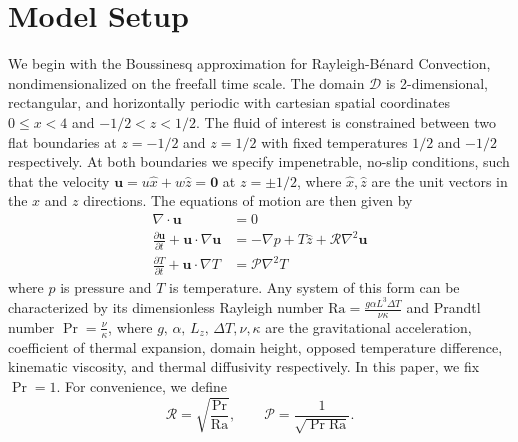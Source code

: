 \documentclass[reprint,amsmath,amssymb,aps,nofootinbib]{revtex4-1}
\newcommand\Ra{\mathrm{Ra}}
\renewcommand{\vec}[1]{\boldsymbol{#1}}
\begin{document}
\section{Model Setup}\label{sec:model}
We begin with the Boussinesq approximation for Rayleigh-Bénard Convection, nondimensionalized on the freefall time scale. 
The domain $\mathcal{D}$ is 2-dimensional, rectangular, and horizontally periodic with cartesian spatial coordinates $0 \leq x < 4$ and $-1/2 < z < 1/2$. 
The fluid of interest is constrained between two flat boundaries at $z = -1/2$ and $z = 1/2$ with fixed temperatures $1/2$ and $-1/2$ respectively. 
At both boundaries we specify impenetrable, no-slip conditions, such that the velocity $\vec{u} = u \hat{x} + w \hat{z} = \vec{0}$ at $z = \pm 1/2$, where $\hat{x}, \hat{z}$ are the unit vectors in the $x$ and $z$ directions. 
The equations of motion are then given by
\begin{align}
    \nabla \cdot \vec{u} &= 0 \label{EQ:motion1}\\
    \frac{\partial \vec{u}}{\partial t} + \vec{u} \cdot \nabla \vec{u} &= - \nabla p + T \hat{z} + \mathcal{R} \nabla^2 \vec{u} \label{EQ:motion2}\\
    \frac{\partial T}{\partial t} + \vec{u} \cdot \nabla T &= \mathcal{P} \nabla^2 T \label{EQ:motion3}
\end{align}
where $p$ is pressure and $T$ is temperature. 
Any system of this form can be characterized by its dimensionless Rayleigh number $\Ra = \frac{g\alpha L^3 \Delta T}{\nu \kappa}$ and Prandtl number $\Pr = \frac{\nu}{\kappa}$, where $g, \, \alpha, \, L_z, \, \Delta T, \nu, \kappa$ are the gravitational acceleration, coefficient of thermal expansion, domain height, opposed temperature difference, kinematic viscosity, and thermal diffusivity respectively. 
In this paper, we fix $\Pr = 1$.
For convenience, we define
\begin{equation}
\mathcal{R} = \sqrt{\frac{\Pr}{\Ra}}, \qquad \mathcal{P} = \frac{1}{\sqrt{\Pr \Ra}}.
\end{equation}
\end{document}
